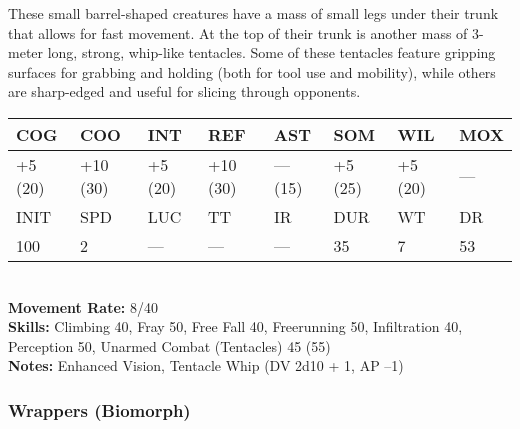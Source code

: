These small barrel-shaped creatures have a mass of small legs under their trunk that allows for fast movement. At the top of their trunk is another mass of 3-meter long, strong, whip-like tentacles. Some of these tentacles feature gripping surfaces for grabbing and holding (both for tool use and mobility), while others are sharp-edged and useful for slicing through opponents. \\ \begin{tabular}{|l|l|l|l|l|l|l|l|} \hline

COG &COO &INT &REF &AST &SOM &WIL &MOX \\ \hline

+5 (20) &+10 (30) &+5 (20) &+10 (30) &— (15) &+5 (25) &+5 (20) &— \\ \hline

INIT &SPD &LUC &TT &IR &DUR &WT &DR \\ \hline

100 &2 &— &— &— &35 &7 &53 \\ \hline

\end{tabular} \\ \textbf{Movement Rate:} 8/40 \\ \textbf{Skills:} Climbing 40, Fray 50, Free Fall 40, Freerunning 50, Infiltration 40, Perception 50, Unarmed Combat (Tentacles) 45 (55) \\ \textbf{Notes: }Enhanced Vision, Tentacle Whip (DV 2d10 + 1, AP –1) 

\subsubsection{Wrappers (Biomorph)} 

